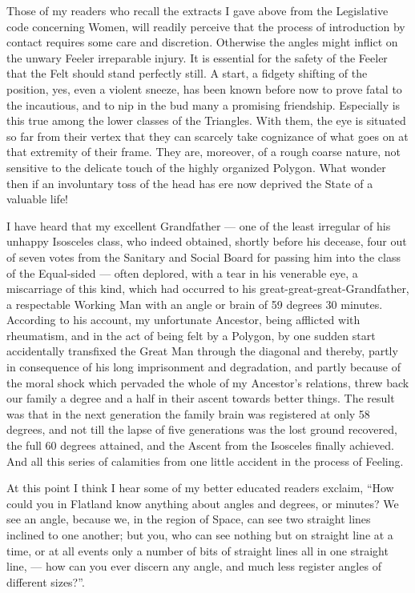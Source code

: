 \documentclass[12pt, a4paper, twoside]{memoir}
\begin{document}
Those of my readers who recall the extracts I gave above from the Legislative
code concerning Women, will readily perceive that the process of introduction
by contact requires some care and discretion. Otherwise the angles might
inflict on the unwary Feeler irreparable injury. It is essential for the
safety of the Feeler that the Felt should stand perfectly still. A start, a
fidgety shifting of the position, yes, even a violent sneeze, has been known
before now to prove fatal to the incautious, and to nip in the bud many a
promising friendship. Especially is this true among the lower classes of the
Triangles. With them, the eye is situated so far from their vertex that they
can scarcely take cognizance of what goes on at that extremity of their frame.
They are, moreover, of a rough coarse nature, not sensitive to the delicate
touch of the highly organized Polygon. What wonder then if an involuntary toss
of the head has ere now deprived the State of a valuable life!

I have heard that my excellent Grandfather --- one of the least irregular of his
unhappy Isosceles class, who indeed obtained, shortly before his decease, four
out of seven votes from the Sanitary and Social Board for passing him into the
class of the Equal-sided --- often deplored, with a tear in his venerable eye, a
miscarriage of this kind, which had occurred to his
great-great-great-Grandfather, a respectable Working Man with an angle or
brain of 59 degrees 30 minutes. According to his account, my unfortunate
Ancestor, being afflicted with rheumatism, and in the act of being felt by a
Polygon, by one sudden start accidentally transfixed the Great Man through the
diagonal and thereby, partly in consequence of his long imprisonment and
degradation, and partly because of the moral shock which pervaded the whole of
my Ancestor's relations, threw back our family a degree and a half in their
ascent towards better things. The result was that in the next generation the
family brain was registered at only 58 degrees, and not till the lapse of five
generations was the lost ground recovered, the full 60 degrees attained, and
the Ascent from the Isosceles finally achieved. And all this series of
calamities from one little accident in the process of Feeling.

At this point I think I hear some of my better educated readers exclaim, ``How
could you in Flatland know anything about angles and degrees, or minutes? We
see an angle, because we, in the region of Space, can see two straight lines
inclined to one another; but you, who can see nothing but on straight line at
a time, or at all events only a number of bits of straight lines all in one
straight line, --- how can you ever discern any angle, and much less register
angles of different sizes?''.
\end{document}
